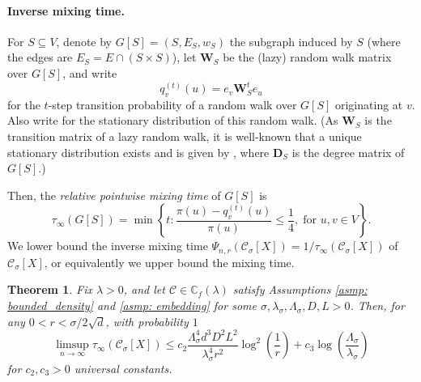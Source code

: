 \documentclass{article}
\newcommand{\set}[1]{\left\{#1\right\}}
\newcommand{\vol}{\mathrm{vol}}
\newcommand{\1}{\mathbf{1}}
\newcommand{\Xbf}{X}             %
\newcommand{\Wbf}{\mathbf{W}}
\newcommand{\Dbf}{\mathbf{D}}
\newcommand{\Cbb}{\mathbb{C}}
\newcommand{\Cset}{\mathcal{C}}
\newcommand{\Csig}{\Cset_{\sigma}}
\theoremstyle{aldenthm}
\newtheorem{theorem}{Theorem}
\theoremstyle{aldenrmrk}
\begin{document}
\paragraph{Inverse mixing time.}
For $S \subseteq V$, denote by $G[S] = (S, E_S, w_S)$ the subgraph induced by 
$S$ (where the edges are $E_S = E \cap (S \times S)$), let $\Wbf_S$ be the (lazy) random walk matrix over $G[S]$, and write 
$$
q_{v}^{(t)}(u) = e_v\Wbf_S^t e_u
$$
for the $t$-step transition probability of a random walk over $G[S]$
originating at $v$. Also write 
for the stationary distribution of this random walk.  (As
$\Wbf_S$ is the transition matrix of a lazy random walk, it is well-known that a unique stationary distribution exists and is given by
\smash{$\pi_u = (\Dbf_S)_{uu}/\vol(S; G[S])$}, where $\Dbf_S$ is the degree matrix of $G[S]$.)

Then, the \emph{relative pointwise mixing time} of $G[S]$ is 
\begin{equation}
\label{eqn: mixing_time}
\tau_{\infty}(G[S]) = \min\set{ t: \frac{\pi(u) - q_{v}^{(t)}(u)
	}{\pi(u)} \leq \frac{1}{4}, 
	\; \text{for $u,v \in V$}}. 
\end{equation}
We lower bound the inverse mixing time $\Psi_{n,r}(\Csig[\Xbf]) = 1/\tau_{\infty}(\Csig[\Xbf])$ of $\Csig[\Xbf]$, or equivalently we upper bound the mixing time.

\begin{theorem}
	\label{thm: mixing_time_upper_bound}
	Fix $\lambda > 0$, and let $\Cset \in \Cbb_f(\lambda)$ satisfy Assumptions \ref{asmp: bounded_density} and \ref{asmp: embedding} for some $\sigma, \lambda_{\sigma}, \Lambda_{\sigma}, D, L > 0$. Then, for any $0 < r < \sigma/2\sqrt{d}$, with probability $1$
	\begin{equation}
	\label{eqn: mixing_time_upper_bound}
	\limsup_{n \to \infty}\tau_{\infty}(\Csig[\Xbf]) \leq c_2 \frac{\Lambda_{\sigma}^4 d^3 D^2 L^2}{\lambda_{\sigma}^4 r^2} \log^2\left(\frac{1}{r}\right) + c_3 \log\left(\frac{\Lambda_{\sigma}}{\lambda_{\sigma}}\right)
	\end{equation}
	for $c_2,c_3 > 0$ universal constants. 
\end{theorem}
\end{document}
